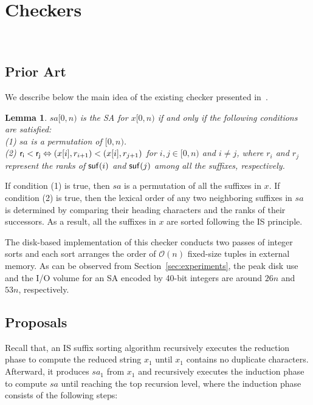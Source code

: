 \documentclass[10pt,journal,compsoc]{IEEEtran}
\newtheorem{lemma}[theorem]{Lemma}
\begin{document}
\section{Checkers}~\label{sec:checkers}

\subsection{Prior Art} \label{sec:checkers:prior_art}

We describe below the main idea of the existing checker presented in~\cite{Dementiev2008a}.

\begin{lemma} \label{lemma:1}
	$sa[0, n)$ is the SA for $x[0, n)$ if and only if the following conditions are satisfied:\\
	(1) $sa$ is a permutation of $[0, n)$. \\	
	(2) ${\sf r_i < r_j} \Leftrightarrow (x[i], r_{i + 1}) < (x[i], r_{j + 1})$ for $ i, j \in [0, n)$ and $i\ne j$, where $r_i$ and $r_j$ represent the ranks of ${\sf suf}(i)$ and ${\sf suf}(j)$ among all the suffixes, respectively. \\
\end{lemma}

\begin{IEEEproof} If condition (1) is true, then $sa$ is a permutation of all the suffixes in $x$. If condition (2) is true, then the lexical order of any two neighboring suffixes in $sa$ is determined by comparing their heading characters and the ranks of their successors. As a result, all the suffixes in $x$ are sorted following the IS principle.

\end{IEEEproof}

The disk-based implementation of this checker conducts two passes of integer sorts and each sort arranges the order of $\mathcal{O}(n)$ fixed-size tuples in external memory. As can be observed from Section~\ref{sec:experiments}, the peak disk use and the I/O volume for an SA encoded by 40-bit integers are around $26n$ and $53n$, respectively.

\subsection{Proposals} \label{sec:checkers:proposals}

Recall that, an IS suffix sorting algorithm recursively executes the reduction phase to compute the reduced string $x_1$ until $x_1$ contains no duplicate characters. Afterward, it produces $sa_1$ from $x_1$ and recursively executes the induction phase to compute $sa$ until reaching the top recursion level, where the induction phase consists of the following steps:
\end{document}
